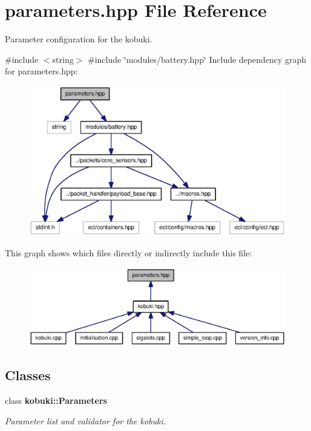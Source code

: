 \section{parameters.\-hpp \-File \-Reference}
\label{parameters_8hpp}


\-Parameter configuration for the kobuki.  


{\ttfamily \#include $<$string$>$}\*
{\ttfamily \#include \char`\"{}modules/battery.\-hpp\char`\"{}}\*
\-Include dependency graph for parameters.\-hpp\-:
\nopagebreak
\begin{figure}[H]
\begin{center}
\leavevmode
\includegraphics[width=350pt]{parameters_8hpp__incl}
\end{center}
\end{figure}
\-This graph shows which files directly or indirectly include this file\-:
\nopagebreak
\begin{figure}[H]
\begin{center}
\leavevmode
\includegraphics[width=350pt]{parameters_8hpp__dep__incl}
\end{center}
\end{figure}
\subsection*{\-Classes}
\begin{DoxyCompactItemize}
\item 
class {\bf kobuki\-::\-Parameters}
\begin{DoxyCompactList}\small\item\em \-Parameter list and validator for the kobuki. \end{DoxyCompactList}\end{DoxyCompactItemize}
